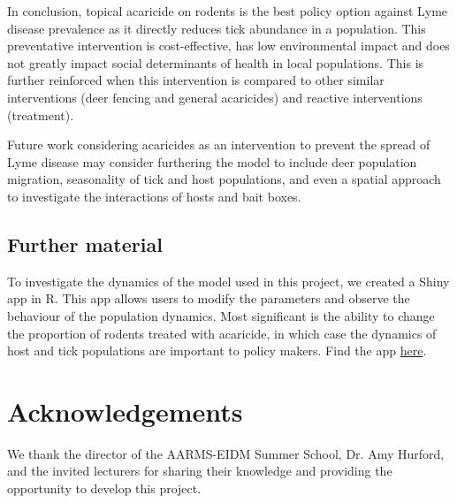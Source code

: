 \documentclass[12pt, centerh1]{article}
\begin{document}
In conclusion, topical acaricide on rodents is the best policy option against Lyme disease prevalence as it directly reduces tick abundance in a population. This preventative intervention is cost-effective, has low environmental impact and does not greatly impact social determinants of health in local populations. This is further reinforced when this intervention is compared to other similar interventions (deer fencing and general acaricides) and reactive interventions (treatment).

Future work considering acaricides as an intervention to prevent the spread of Lyme disease may consider furthering the model to include deer population migration, seasonality of tick and host populations, and even a spatial approach to investigate the interactions of hosts and bait boxes. 

\subsection{Further material}

To investigate the dynamics of the model used in this project, we created a Shiny app in R. This app allows users to modify the parameters and observe the behaviour of the population dynamics. Most significant is the ability to change the proportion of rodents treated with acaricide, in which case the dynamics of host and tick populations are important to policy makers. Find the app \href{https://stelmacs.shinyapps.io/Lyme_disease/}{here}.

\section{Acknowledgements}

We thank the director of the AARMS-EIDM Summer School, Dr. Amy Hurford, and the invited lecturers for sharing their knowledge and providing the opportunity to develop this project.

\newpage

\end{document}
